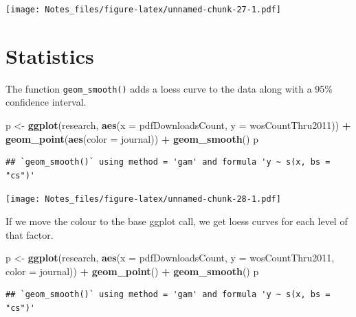 \documentclass[
]{book}
\newenvironment{Shaded}{\begin{snugshade}}{\end{snugshade}}
\newcommand{\DataTypeTok}[1]{\textcolor[rgb]{0.13,0.29,0.53}{#1}}
\newcommand{\KeywordTok}[1]{\textcolor[rgb]{0.13,0.29,0.53}{\textbf{#1}}}
\newcommand{\NormalTok}[1]{#1}
\newcommand{\OperatorTok}[1]{\textcolor[rgb]{0.81,0.36,0.00}{\textbf{#1}}}
\newcommand{\StringTok}[1]{\textcolor[rgb]{0.31,0.60,0.02}{#1}}
\begin{document}
\texttt{[image: Notes\_files/figure-latex/unnamed-chunk-27-1.pdf]}

\hypertarget{statistics}{%
\section{Statistics}\label{statistics}}

The function \texttt{geom\_smooth()} adds a loess curve to the data along with a 95\% confidence interval.

\begin{Shaded}
\begin{Highlighting}[]
\NormalTok{p <-}\StringTok{ }\KeywordTok{ggplot}\NormalTok{(research, }\KeywordTok{aes}\NormalTok{(}\DataTypeTok{x =}\NormalTok{ pdfDownloadsCount,}
                          \DataTypeTok{y =}\NormalTok{ wosCountThru2011)) }\OperatorTok{+}
\StringTok{  }\KeywordTok{geom_point}\NormalTok{(}\KeywordTok{aes}\NormalTok{(}\DataTypeTok{color =}\NormalTok{ journal)) }\OperatorTok{+}
\StringTok{  }\KeywordTok{geom_smooth}\NormalTok{()}
\NormalTok{p}
\end{Highlighting}
\end{Shaded}

\begin{verbatim}
## `geom_smooth()` using method = 'gam' and formula 'y ~ s(x, bs = "cs")'
\end{verbatim}

\texttt{[image: Notes\_files/figure-latex/unnamed-chunk-28-1.pdf]}

If we move the colour to the base ggplot call, we get loess curves for each level of that factor.

\begin{Shaded}
\begin{Highlighting}[]
\NormalTok{p <-}\StringTok{ }\KeywordTok{ggplot}\NormalTok{(research, }\KeywordTok{aes}\NormalTok{(}\DataTypeTok{x =}\NormalTok{ pdfDownloadsCount, }
                          \DataTypeTok{y =}\NormalTok{ wosCountThru2011, }
                          \DataTypeTok{color =}\NormalTok{ journal)) }\OperatorTok{+}\StringTok{ }
\StringTok{  }\KeywordTok{geom_point}\NormalTok{() }\OperatorTok{+}\StringTok{ }
\StringTok{  }\KeywordTok{geom_smooth}\NormalTok{()}
\NormalTok{p}
\end{Highlighting}
\end{Shaded}

\begin{verbatim}
## `geom_smooth()` using method = 'gam' and formula 'y ~ s(x, bs = "cs")'
\end{verbatim}
\end{document}
